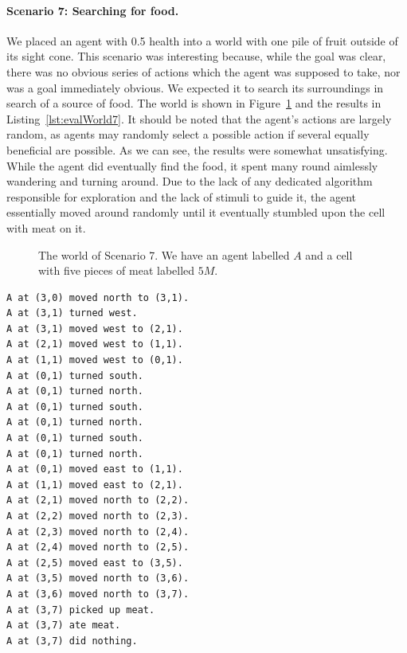 \paragraph{Scenario 7: Searching for food.} We placed an agent with 0.5 health into a world with one pile of fruit outside of its sight cone. This scenario was interesting because, while the goal was clear, there was no obvious series of actions which the agent was supposed to take, nor was a goal immediately obvious. We expected it to search its surroundings in search of a source of food. The world is shown in Figure~\ref{fig:evalWorld7} and the results in Listing~\ref{lst:evalWorld7}. It should be noted that the agent's actions are largely random, as agents may randomly select a possible action if several equally beneficial are possible. As we can see, the results were somewhat unsatisfying. While the agent did eventually find the food, it spent many round aimlessly wandering and turning around. Due to the lack of any dedicated algorithm responsible for exploration and the lack of stimuli to guide it, the agent essentially moved around randomly until it eventually stumbled upon the cell with meat on it.

\begin{figure}[t]
    \centering
    
    \caption{The world of Scenario 7. We have an agent labelled $A$ and a cell with five pieces of meat labelled $5M$.}
    \label{fig:evalWorld7}
\end{figure}

\begin{lstlisting}[caption=Actions in Scenario 7., label=lst:evalWorld7, float=t]
A at (3,0) moved north to (3,1).
A at (3,1) turned west.
A at (3,1) moved west to (2,1).
A at (2,1) moved west to (1,1).
A at (1,1) moved west to (0,1).
A at (0,1) turned south.
A at (0,1) turned north.
A at (0,1) turned south.
A at (0,1) turned north.
A at (0,1) turned south.
A at (0,1) turned north.
A at (0,1) moved east to (1,1).
A at (1,1) moved east to (2,1).
A at (2,1) moved north to (2,2).
A at (2,2) moved north to (2,3).
A at (2,3) moved north to (2,4).
A at (2,4) moved north to (2,5).
A at (2,5) moved east to (3,5).
A at (3,5) moved north to (3,6).
A at (3,6) moved north to (3,7).
A at (3,7) picked up meat.
A at (3,7) ate meat.
A at (3,7) did nothing.
\end{lstlisting}


